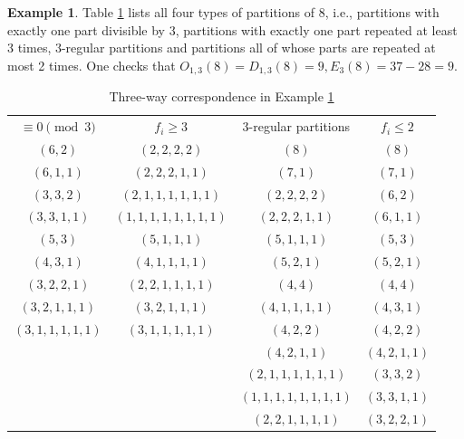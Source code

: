 \documentclass[12pt]{amsart}
\numberwithin{equation}{section}
\theoremstyle{plain}
\theoremstyle{definition}
\newtheorem{example}[theorem]{Example}
\begin{document}
\begin{example}\label{exam1}
Table \ref{Tab1} lists all four types of partitions of 8, i.e., partitions with exactly one part divisible by 3, partitions with exactly one part repeated at least 3 times, $3$-regular partitions and partitions all of whose parts are repeated at most 2 times. One checks that $O_{1,3}(8)=D_{1,3}(8)=9, E_{3}(8)=37-28=9$.
\end{example}
\begin{table}[tbp]\caption{Three-way correspondence in Example \ref{exam1}}\label{Tab1}
\centering
\begin{tabular}{c||c||cc}
$\equiv0\pmod{3}$ &$f_{i}\geq3$ &3-regular partitions &$f_{i}\leq2$\\
$(6,2)$ &$(2,2,2,2)$ &$(8)$ &$(8)$\\
$(6,1,1)$ &$(2,2,2,1,1)$ &$(7,1)$ &$(7,1)$\\
$(3,3,2)$ &$(2,1,1,1,1,1,1)$ &$(2,2,2,2)$ &$(6,2)$\\
$(3,3,1,1)$ &$(1,1,1,1,1,1,1,1)$ &$(2,2,2,1,1)$ &$(6,1,1)$\\
$(5,3)$ &$(5,1,1,1)$ &$(5,1,1,1)$ &$(5,3)$\\
$(4,3,1)$ &$(4,1,1,1,1)$ &$(5,2,1)$ &$(5,2,1)$\\
$(3,2,2,1)$ &$(2,2,1,1,1,1)$ &$(4,4)$ &$(4,4)$\\
$(3,2,1,1,1)$ &$(3,2,1,1,1)$ &$(4,1,1,1,1)$ &$(4,3,1)$\\
$(3,1,1,1,1,1)$ &$(3,1,1,1,1,1)$ &$(4,2,2)$ &$(4,2,2)$\\
 & &$(4,2,1,1)$ &$(4,2,1,1)$\\
 & &$(2,1,1,1,1,1,1)$ &$(3,3,2)$\\
 & &$(1,1,1,1,1,1,1,1)$ &$(3,3,1,1)$\\
 & &$(2,2,1,1,1,1)$ &$(3,2,2,1)$
\end{tabular}
\end{table}



\end{document}
